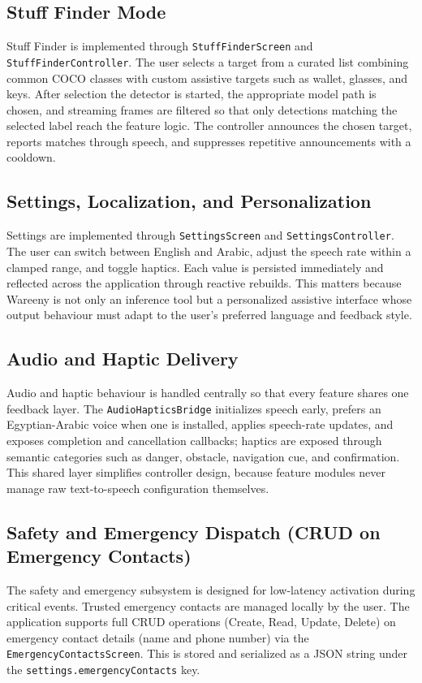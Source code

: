 \documentclass[a4paper]{report}
\begin{document}
\subsection{Stuff Finder Mode}
Stuff Finder is implemented through \texttt{StuffFinderScreen} and \texttt{StuffFinderController}. The user selects a target from a curated list combining common COCO classes with custom assistive targets such as wallet, glasses, and keys. After selection the detector is started, the appropriate model path is chosen, and streaming frames are filtered so that only detections matching the selected label reach the feature logic. The controller announces the chosen target, reports matches through speech, and suppresses repetitive announcements with a cooldown.

\subsection{Settings, Localization, and Personalization}
Settings are implemented through \texttt{SettingsScreen} and \texttt{SettingsController}. The user can switch between English and Arabic, adjust the speech rate within a clamped range, and toggle haptics. Each value is persisted immediately and reflected across the application through reactive rebuilds. This matters because Wareeny is not only an inference tool but a personalized assistive interface whose output behaviour must adapt to the user's preferred language and feedback style.

\subsection{Audio and Haptic Delivery}
Audio and haptic behaviour is handled centrally so that every feature shares one feedback layer. The \texttt{AudioHapticsBridge} initializes speech early, prefers an Egyptian-Arabic voice when one is installed, applies speech-rate updates, and exposes completion and cancellation callbacks; haptics are exposed through semantic categories such as danger, obstacle, navigation cue, and confirmation. This shared layer simplifies controller design, because feature modules never manage raw text-to-speech configuration themselves.

\subsection{Safety and Emergency Dispatch (CRUD on Emergency Contacts)}
The safety and emergency subsystem is designed for low-latency activation during critical events. Trusted emergency contacts are managed locally by the user. The application supports full CRUD operations (Create, Read, Update, Delete) on emergency contact details (name and phone number) via the \texttt{EmergencyContactsScreen}. This is stored and serialized as a JSON string under the \texttt{settings.emergencyContacts} key.
\end{document}
